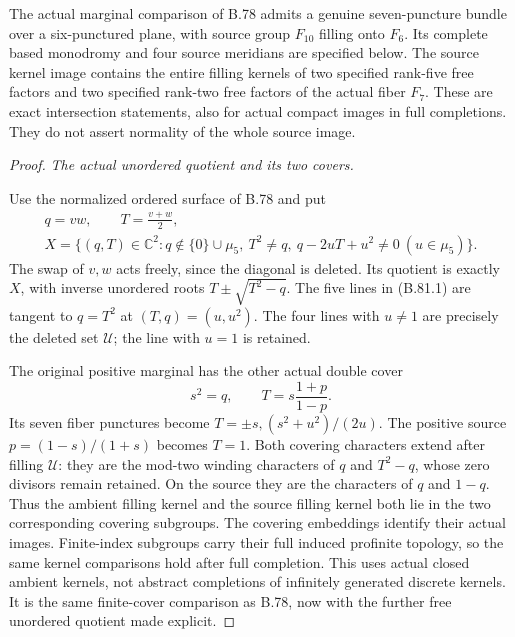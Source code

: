The actual marginal comparison of B.78 admits a genuine seven-puncture
bundle over a six-punctured plane, with source group \(F_{10}\) filling
onto \(F_6\). Its complete based monodromy and four source meridians are
specified below. The source kernel image contains the entire filling
kernels of two specified rank-five free factors and two specified
rank-two free factors of the actual fiber \(F_7\). These are exact
intersection statements, also for actual compact images in full
completions. They do not assert normality of the whole source image.

\begin{proof}
\emph{The actual unordered quotient and its two covers.}\par
Use the normalized ordered surface of B.78 and put
\[
 \begin{gathered}
 q=vw,\qquad T=\frac{v+w}{2},\\
 X=\{(q,T)\in\mathbb C^2:q\notin\{0\}\cup\mu _5,
       \ T^2\ne q,\ q-2uT+u^2\ne0\ (u\in\mu _5)\}.
 \end{gathered}
 \tag{B.81.1}
\]
The swap of \(v,w\) acts freely, since the diagonal is deleted.
Its quotient is exactly \(X\), with inverse unordered roots
\(T\pm\sqrt{T^2-q}\). The five lines in (B.81.1) are tangent to
\(q=T^2\) at \((T,q)=(u,u^2)\). The four lines with \(u\ne1\)
are precisely the deleted set \(\mathcal U\); the line with \(u=1\)
is retained.

The original positive marginal has the other actual double cover
\[
       s^2=q,\qquad T=s\frac{1+p}{1-p}.
 \tag{B.81.2}
\]
Its seven fiber punctures become
\(T=\pm s,(s^2+u^2)/(2u)\). The positive source
\(p=(1-s)/(1+s)\) becomes \(T=1\). Both covering characters
extend after filling \(\mathcal U\): they are the mod-two winding
characters of \(q\) and \(T^2-q\), whose zero divisors remain
retained. On the source they are the characters of \(q\) and
\(1-q\). Thus the ambient filling kernel and the source filling
kernel both lie in the two corresponding covering subgroups.
The covering embeddings identify their actual images. Finite-index
subgroups carry their full induced profinite topology, so the same
kernel comparisons hold after full completion. This uses actual
closed ambient kernels, not abstract completions of infinitely
generated discrete kernels. It is the same finite-cover comparison
as B.78, now with the further free unordered quotient made explicit.


\end{proof}
